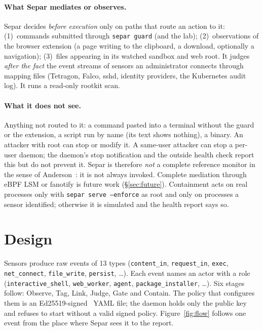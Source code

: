 \documentclass[10pt,twocolumn,letterpaper]{article}
\begin{document}
\paragraph{What Separ mediates or observes.} Separ decides \emph{before execution} only on paths
that route an action to it: (1)~commands submitted through \texttt{separ guard} (and the lab);
(2)~observations of the browser extension (a page writing to the clipboard, a download, optionally
a navigation); (3)~files appearing in its watched sandbox and web root. It judges \emph{after the
fact} the event streams of sensors an administrator connects through mapping files (Tetragon,
Falco, sshd, identity providers, the Kubernetes audit log). It runs a read-only rootkit scan.

\paragraph{What it does not see.} Anything not routed to it: a command pasted into a terminal
without the guard or the extension, a script run by name (its text shows nothing), a binary.
An attacker with root can stop or modify it. A same-user attacker can stop a per-user daemon; the
daemon's stop notification and the outside health check report this but do not prevent it.
Separ is therefore \emph{not} a complete reference monitor in the sense of
Anderson~\cite{anderson1972computer}: it is not always invoked. Complete mediation through eBPF LSM
or fanotify is future work (\S\ref{sec:future}). Containment acts on real processes only with
\texttt{separ serve --enforce} as root and only on processes a sensor identified; otherwise it is
simulated and the health report says so.

\section{Design}
\label{sec:design}

Sensors produce raw events of 13 types (\texttt{content\_in}, \texttt{request\_in},
\texttt{exec}, \texttt{net\_connect}, \texttt{file\_write}, \texttt{persist}, \ldots). Each event
names an actor with a role (\texttt{interactive\_shell}, \texttt{web\_worker}, \texttt{agent},
\texttt{package\_installer}, \ldots). Six stages follow: Observe, Tag, Link, Judge, Gate and
Contain. The policy that configures them is an Ed25519-signed~\cite{bernstein2012high} YAML file;
the daemon holds only the public key and refuses to start without a valid signed policy.
Figure~\ref{fig:flow} follows one event from the place where Separ sees it to the report.
\end{document}
